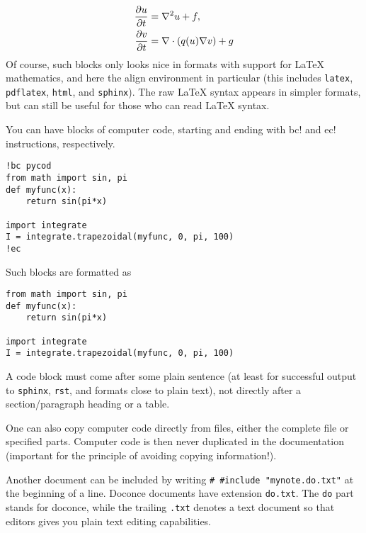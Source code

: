 \documentclass[%
oneside,                 %
final,                   %
10pt]{article}
\begin{document}
\begin{align}
{\partial u\over\partial t} &= \nabla^2 u + f, \label{myeq1}\\ 
{\partial v\over\partial t} &= \nabla\cdot(q(u)\nabla v) + g
\end{align}
Of course, such blocks only looks nice in formats with support
for {\LaTeX} mathematics, and here the align environment in particular
(this includes {\fontsize{10pt}{10pt}\Verb!latex!}, {\fontsize{10pt}{10pt}\Verb!pdflatex!}, {\fontsize{10pt}{10pt}\Verb!html!}, and {\fontsize{10pt}{10pt}\Verb!sphinx!}). The raw
{\LaTeX} syntax appears in simpler formats, but can still be useful
for those who can read {\LaTeX} syntax.

You can have blocks of computer code, starting and ending with
{\fontsize{10pt}{10pt}\Verb!!bc!} and {\fontsize{10pt}{10pt}\Verb!!ec!} instructions, respectively.

\begin{Verbatim}[fontsize=\fontsize{9pt}{9pt},tabsize=8,baselinestretch=0.85,
fontfamily=tt,xleftmargin=7mm]
!bc pycod
from math import sin, pi
def myfunc(x):
    return sin(pi*x)

import integrate
I = integrate.trapezoidal(myfunc, 0, pi, 100)
!ec
\end{Verbatim}
\noindent
Such blocks are formatted as

\begin{verbatim}
from math import sin, pi
def myfunc(x):
    return sin(pi*x)

import integrate
I = integrate.trapezoidal(myfunc, 0, pi, 100)
\end{verbatim}
\noindent
A code block must come after some plain sentence (at least for successful
output to {\fontsize{10pt}{10pt}\Verb!sphinx!}, {\fontsize{10pt}{10pt}\Verb!rst!}, and formats close to plain text),
not directly after a section/paragraph heading or a table.


One can also copy computer code directly from files, either the
complete file or specified parts.  Computer code is then never
duplicated in the documentation (important for the principle of
avoiding copying information!).

Another document can be included by writing {\fontsize{10pt}{10pt}\Verb!# #include "mynote.do.txt"!}
at the beginning of a line.  Doconce documents have
extension {\fontsize{10pt}{10pt}\Verb!do.txt!}. The {\fontsize{10pt}{10pt}\Verb!do!} part stands for doconce, while the
trailing {\fontsize{10pt}{10pt}\Verb!.txt!} denotes a text document so that editors gives you
plain text editing capabilities.
\end{document}
